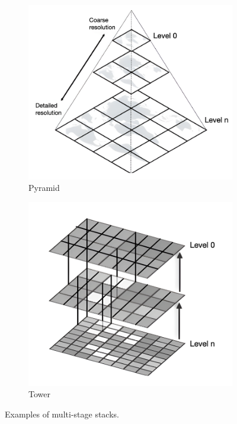 \begin{figure}[!h]
\centering
\begin{subfigure}{0.49\linewidth}
\includegraphics[width=\linewidth]{img/ch4/pyramid.png}
\caption{Pyramid}
\end{subfigure}
\begin{subfigure}{0.49\linewidth}
\includegraphics[width=\linewidth]{img/ch4/tower.png}    
\caption{Tower}
\end{subfigure}
\caption{Examples of multi-stage stacks.}
\label{f:multi}
\end{figure}

